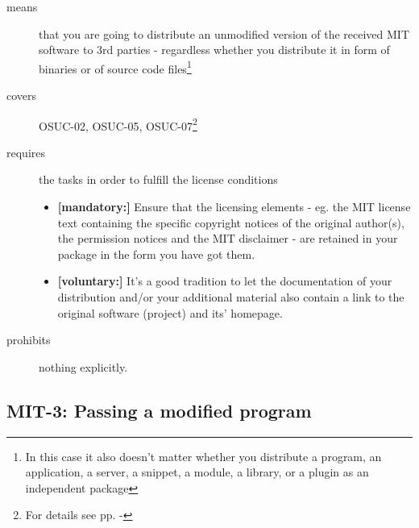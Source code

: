 \begin{description}
\item[means] that you are going to distribute an unmodified version of the
received MIT software to 3rd parties - regardless whether you distribute it in
form of binaries or of source code files\footnote{In this case it also doesn't
matter whether you distribute a program, an application, a server, a snippet, a
module, a library, or a plugin as an independent package}

\item[covers] OSUC-02, OSUC-05, OSUC-07\footnote{For details see pp.
\pageref{OSUC-02-DEF} - \pageref{OSUC-07-DEF}}

\item[requires] the tasks in order to fulfill the license conditions
\begin{itemize}
  \item \textbf{[mandatory:]} Ensure that the licensing elements - eg.
  the MIT license text containing the specific copyright notices of the original
  author(s), the permission notices and the MIT disclaimer - are retained in
  your package in the form you have got them.
  \item \textbf{[voluntary:]} It's a good tradition to let the documentation of
  your distribution and/or your additional material also contain a link to the
  original software (project) and its' homepage.
\end{itemize}
\item[prohibits] nothing explicitly.
\end{description}

\subsection{MIT-3: Passing a modified program}
\label{OSUC-04-MIT}

